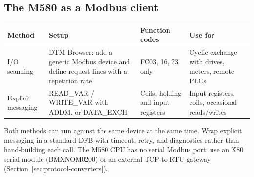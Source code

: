 \subsection*{The M580 as a Modbus client}
\begin{longtable}{@{}P{3.25cm}P{4.98cm}P{3.25cm}P{4.98cm}@{}}
\toprule
\textbf{Method} & \textbf{Setup} & \textbf{Function codes} & \textbf{Use for} \\
\midrule
\endhead
I/O scanning & DTM Browser: add a generic Modbus device and define request lines with a repetition rate & FC03, 16, 23 only & Cyclic exchange with drives, meters, remote PLCs \\
Explicit messaging & READ\_VAR / WRITE\_VAR with ADDM, or DATA\_EXCH & Coils, holding and input registers & Input registers, coils, occasional reads/writes \\
\bottomrule
\end{longtable}
Both methods can run against the same device at the same time. Wrap explicit messaging in a standard DFB with timeout, retry, and diagnostics rather than hand-building each call. The M580 CPU has no serial Modbus port: use an X80 serial module (BMXNOM0200) or an external TCP-to-RTU gateway (Section~\ref{sec:protocol-converters}).


